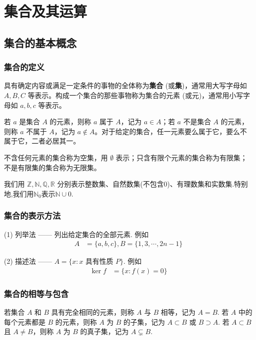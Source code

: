 \documentclass[../../main.tex]{subfiles}
\begin{document}
\section{集合及其运算}

\subsection{集合的基本概念}

\subsubsection*{集合的定义}

\begin{definition}[集合]
具有确定内容或满足一定条件的事物的全体称为\textbf{集合} (或\textbf{集})，通常用大写字母如 \(A, B, C\) 等表示。构成一个集合的那些事物称为集合的元素 (或元)，通常用小写字母如 \(a, b, c\) 等表示。
\end{definition}

若 \(a\) 是集合 \(A\) 的元素，则称 \(a\) 属于 \(A\)，记为 \(a \in A\)；若 \(a\) 不是集合 \(A\) 的元素，则称 \(a\) 不属于 \(A\)，记为 \(a \notin A\)。对于给定的集合，任一元素要么属于它，要么不属于它，二者必居其一。

不含任何元素的集合称为空集，用 \(\emptyset\) 表示；只含有限个元素的集合称为有限集；不是有限集的集合称为无限集。

我们用 \(\mathbb{Z}, \mathbb{N}, \mathbb{Q}, \mathbb{R}\) 分别表示整数集、自然数集(不包含0)、有理数集和实数集.特别地,我们用$\mathbb{N}_0$表示$\mathbb{N}\cup 0$.

\subsubsection*{集合的表示方法}

(1) 列举法 —— 列出给定集合的全部元素. 例如
\begin{align*}
A &= \{a, b, c\}, B = \{1, 3, \cdots, 2n - 1\}
\end{align*}

(2) 描述法 —— \(A = \{x : x \text{ 具有性质 } P\}\). 例如
\begin{align*}
\ker f &= \{x : f(x) = 0\}
\end{align*}

\subsubsection*{集合的相等与包含}

若集合 \(A\) 和 \(B\) 具有完全相同的元素，则称 \(A\) 与 \(B\) 相等，记为 \(A = B\).
若 \(A\) 中的每个元素都是 \(B\) 的元素，则称 \(A\) 为 \(B\) 的子集，记为 \(A \subset B\) 或 \(B \supset A\).
若 \(A \subset B\) 且 \(A \neq B\)，则称 \(A\) 为 \(B\) 的真子集，记为 \(A \subsetneq B\).
\end{document}
